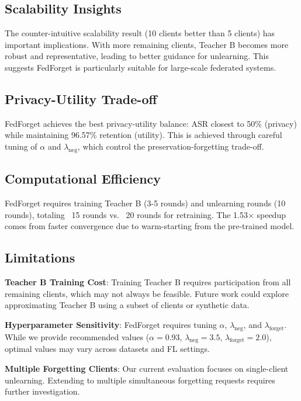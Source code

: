 \documentclass[11pt,a4paper]{article}
\begin{document}
\subsection{Scalability Insights}

The counter-intuitive scalability result (10 clients better than 5 clients) has important implications. With more remaining clients, Teacher B becomes more robust and representative, leading to better guidance for unlearning. This suggests FedForget is particularly suitable for large-scale federated systems.

\subsection{Privacy-Utility Trade-off}

FedForget achieves the best privacy-utility balance: ASR closest to 50\% (privacy) while maintaining 96.57\% retention (utility). This is achieved through careful tuning of $\alpha$ and $\lambda_{\text{neg}}$, which control the preservation-forgetting trade-off.

\subsection{Computational Efficiency}

FedForget requires training Teacher B (3-5 rounds) and unlearning rounds (10 rounds), totaling ~15 rounds vs. ~20 rounds for retraining. The 1.53× speedup comes from faster convergence due to warm-starting from the pre-trained model.

\subsection{Limitations}

\textbf{Teacher B Training Cost}: Training Teacher B requires participation from all remaining clients, which may not always be feasible. Future work could explore approximating Teacher B using a subset of clients or synthetic data.

\textbf{Hyperparameter Sensitivity}: FedForget requires tuning $\alpha$, $\lambda_{\text{neg}}$, and $\lambda_{\text{forget}}$. While we provide recommended values ($\alpha=0.93$, $\lambda_{\text{neg}}=3.5$, $\lambda_{\text{forget}}=2.0$), optimal values may vary across datasets and FL settings.

\textbf{Multiple Forgetting Clients}: Our current evaluation focuses on single-client unlearning. Extending to multiple simultaneous forgetting requests requires further investigation.
\end{document}
